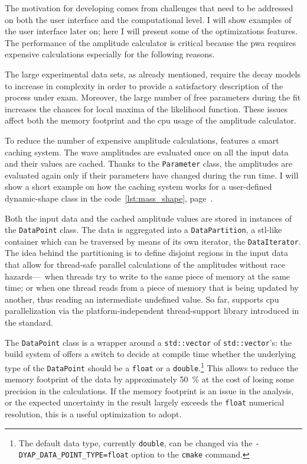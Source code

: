     The motivation for developing  comes from challenges that need to be addressed on both the user interface and the computational level.
    I will show examples of the user interface later on; here I will present some of the optimizations  features.
    The performance of the amplitude calculator is critical because the \ac{pwa} requires expensive calculations especially for the following reasons.


    The large experimental data sets, as already mentioned, require the decay models to increase in complexity in order to provide a satisfactory description of the process under exam.
    Moreover, the large number of free parameters during the fit increases the chances for local maxima of the likelihood function.
    These issues affect both the memory footprint and the \acs{cpu} usage of the amplitude calculator.


    To reduce the number of expensive amplitude calculations,  features a smart caching system.
    The wave amplitudes are evaluated once on all the input data and their values are cached.
    Thanks to the \lstinline!Parameter! class, the amplitudes are evaluated again only if their parameters have changed during the run time.
    I will show a short example on how the caching system works for a user-defined dynamic-shape class in the code~\ref{lst:mass_shape}, page~\pageref{lst:mass_shape}.


    Both the input data and the cached amplitude values are stored in instances of the \lstinline!DataPoint! class.
    The data is aggregated into a \lstinline!DataPartition!, a \ac{stl}-like container which can be traversed by means of its own iterator, the \lstinline!DataIterator!.
    The idea behind the partitioning is to define disjoint regions in the input data that allow for thread-safe parallel calculations of the amplitudes without race hazards---\ie~when threads try to write to the same piece of memory at the same time; or when one thread reads from a piece of memory that is being updated by another, thus reading an intermediate undefined value.
    So far,  supports \acs{cpu} parallelization via the platform-independent thread-support library introduced in the \cpp[11]{} standard.


    The \lstinline!DataPoint! class is a wrapper around a \lstinline!std::vector! of \lstinline!std::vector!'s: the build system of  offers a switch to decide at compile time whether the underlying type of the \lstinline!DataPoint! should be a \lstinline!float! or a \lstinline!double!.\footnote{The default data type, currently \lstinline!double!, can be changed via the \lstinline[language=bash]|-DYAP_DATA_POINT_TYPE=float| option to the \lstinline!cmake! command.}
    This allows to reduce the memory footprint of the data by approximately \SI{50}{\percent} at the cost of losing some precision in the calculations.
    If the memory footprint is an issue in the analysis, or the expected uncertainty in the result largely exceeds the \lstinline!float! numerical resolution, this is a useful optimization to adopt.


